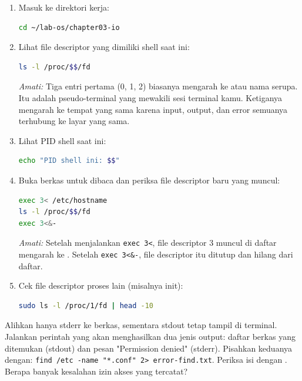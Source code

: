 \begin{enumerate}
    \item Masuk ke direktori kerja:
\begin{lstlisting}[language=bash, caption={Masuk ke direktori kerja}]
cd ~/lab-os/chapter03-io
\end{lstlisting}

    \item Lihat file descriptor yang dimiliki shell saat ini:
\begin{lstlisting}[language=bash, caption={File descriptor proses shell aktif}]
ls -l /proc/$$/fd
\end{lstlisting}
    \textit{Amati:} Tiga entri pertama (0, 1, 2) biasanya mengarah ke  atau nama serupa. Itu adalah pseudo-terminal yang mewakili sesi terminal kamu. Ketiganya mengarah ke tempat yang sama karena input, output, dan error semuanya terhubung ke layar yang sama.

    \item Lihat PID shell saat ini:
\begin{lstlisting}[language=bash, caption={PID shell saat ini}]
echo "PID shell ini: $$"
\end{lstlisting}

    \item Buka berkas untuk dibaca dan periksa file descriptor baru yang muncul:
\begin{lstlisting}[language=bash, caption={Amati penambahan file descriptor baru}]
exec 3< /etc/hostname
ls -l /proc/$$/fd
exec 3<&-
\end{lstlisting}
    \textit{Amati:} Setelah menjalankan \texttt{exec 3<}, file descriptor 3 muncul di daftar mengarah ke . Setelah \texttt{exec 3<\&-}, file descriptor itu ditutup dan hilang dari daftar.

    \item Cek file descriptor proses lain (misalnya init):
\begin{lstlisting}[language=bash, caption={File descriptor proses PID 1}]
sudo ls -l /proc/1/fd | head -10
\end{lstlisting}
\end{enumerate}

\begin{challengebox}
Alihkan hanya stderr ke berkas, sementara stdout tetap tampil di terminal. Jalankan perintah  yang akan menghasilkan dua jenis output: daftar berkas yang ditemukan (stdout) dan pesan "Permission denied" (stderr). Pisahkan keduanya dengan: \texttt{find /etc -name "*.conf" 2> error-find.txt}. Periksa isi  dengan . Berapa banyak kesalahan izin akses yang tercatat?
\end{challengebox}

